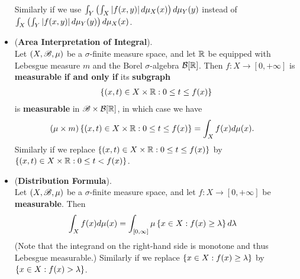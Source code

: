 \documentclass[11pt]{article}
\begin{document}
\begin{itemize}
\begin{corollary}
Similarly if we use $ \int_Y\left(\int_X \left\lvert f(x, y) \right\rvert d\mu_X(x) \right)d\mu_Y(y)$ instead of $ \int_X\left(\int_Y \left\lvert f(x, y) \right\rvert d\mu_Y(y)\right) d\mu_X(x) $.
\end{corollary}

\item \begin{proposition} (\textbf{Area Interpretation of Integral}).  \citep{tao2011introduction}\\
Let $(X, {\mathscr B}, \mu)$ be a $\sigma$-finite measure space, and let ${\mathbb R}$ be equipped with Lebesgue measure $m$ and the Borel $\sigma$-algebra ${\mathcal B}[{\mathbb R}]$. Then $f : X \to [0, +\infty]$ is \textbf{measurable} \textbf{if and only if} its \textbf{subgraph}
\begin{align*}
\left\{(x, t)\in X \times {\mathbb R}: 0 \le t\le f(x)\right\}
\end{align*} is \textbf{measurable} in ${\mathscr B} \times {\mathcal B}[{\mathbb R}]$, in which case we have
\begin{align*}
\left(\mu \times m\right)\left\{(x, t)\in X \times {\mathbb R}: 0 \le t\le f(x)\right\} &= \int_{X} f(x) d\mu(x).
\end{align*} Similarly if we replace $\left\{(x, t)\in X \times {\mathbb R}: 0 \le t\le f(x)\right\}$ by $\left\{(x, t)\in X \times {\mathbb R}: 0 \le t < f(x)\right\}$.
\end{proposition}

\item \begin{proposition} (\textbf{Distribution Formula}).  \citep{tao2011introduction}\\
Let $(X, {\mathscr B}, \mu)$ be a $\sigma$-finite measure space, and let $f : X \to [0, +\infty]$ be \textbf{measurable}. Then
\begin{align}
 \int_{X} f(x) d\mu(x) &= \int_{[0, \infty]}\mu\left\{x\in X: f(x) \ge \lambda\right\} d\lambda \label{eqn: distribution_formula}
\end{align}
(Note that the integrand on the right-hand side is monotone and thus Lebesgue measurable.) Similarly if we replace $\left\{x\in X: f(x) \ge \lambda\right\}$ by $\left\{x\in X: f(x) > \lambda\right\}$.
\end{proposition}
\end{itemize}
\newpage


\end{document}

